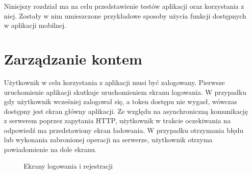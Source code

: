 
Niniejszy rozdział ma na celu przedstawienie testów aplikacji oraz korzystania z niej. Zostały w nim umieszczone przykładowe sposoby użycia funkcji dostępnych w aplikacji mobilnej.



\section{Zarządzanie kontem}{
	


Użytkownik w celu korzystania z aplikacji musi być zalogowany. Pierwsze uruchomienie aplikacji skutkuje uruchomieniem ekranu logowania. W przypadku gdy użytkownik wcześniej zalogował się, a token dostępu nie wygasł, wówczas dostępny jest ekran główny aplikacji. Ze względu na asynchroniczną komunikację z serwerem poprzez zapytania HTTP, użytkownik w trakcie oczekiwania na odpowiedź ma przedstawiony ekran ładowania. W przypadku otrzymania błędu lub wykonania zabronionej operacji na serwerze, użytkownik otrzyma powiadomienie na dole ekranu.

\begin{figure}[h]
	\centering
	\quad
	\caption{Ekrany logowania i rejestracji}
	\label{fig:registerpage}
\end{figure}

}
